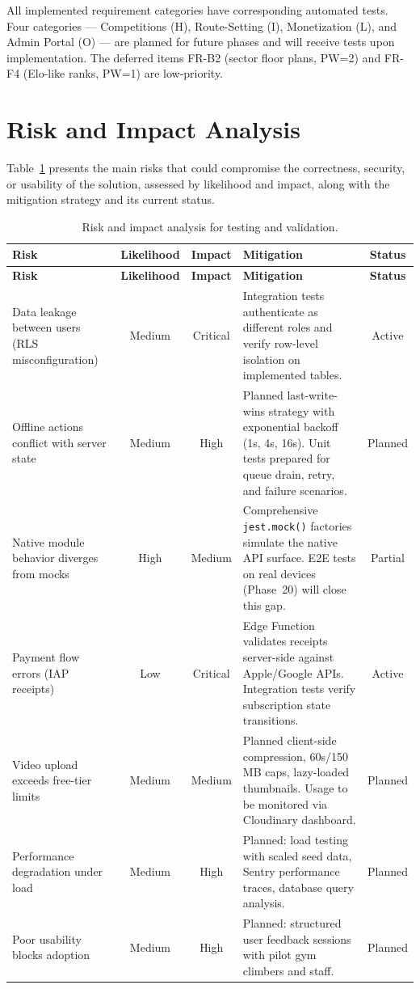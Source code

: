 \documentclass[12pt,a4paper]{report}
\renewcommand\_{\textunderscore\hspace{0pt}}
\begin{document}
All implemented requirement categories have corresponding automated tests. Four categories --- Competitions (H), Route-Setting (I), Monetization (L), and Admin Portal (O) --- are planned for future phases and will receive tests upon implementation. The deferred items FR-B2 (sector floor plans, PW=2) and FR-F4 (Elo-like ranks, PW=1) are low-priority.

\section{Risk and Impact Analysis}

Table~\ref{tab:risk-matrix} presents the main risks that could compromise the correctness, security, or usability of the solution, assessed by likelihood and impact, along with the mitigation strategy and its current status.

\begin{longtable}{p{3.2cm} c c p{5.5cm} c}
\caption{Risk and impact analysis for testing and validation.}\label{tab:risk-matrix}\\
\hline
\textbf{Risk} & \textbf{Likelihood} & \textbf{Impact} & \textbf{Mitigation} & \textbf{Status} \\
\hline
\endfirsthead
\hline
\textbf{Risk} & \textbf{Likelihood} & \textbf{Impact} & \textbf{Mitigation} & \textbf{Status} \\
\hline
\endhead

Data leakage between users (RLS misconfiguration) & Medium & Critical & Integration tests authenticate as different roles and verify row-level isolation on implemented tables. & Active \\
\hline
Offline actions conflict with server state & Medium & High & Planned last-write-wins strategy with exponential backoff (1s, 4s, 16s). Unit tests prepared for queue drain, retry, and failure scenarios. & Planned \\
\hline
Native module behavior diverges from mocks & High & Medium & Comprehensive \texttt{jest.mock()} factories simulate the native API surface. E2E tests on real devices (Phase~20) will close this gap. & Partial \\
\hline
Payment flow errors (IAP receipts) & Low & Critical & Edge Function validates receipts server-side against Apple/Google APIs. Integration tests verify subscription state transitions. & Active \\
\hline
Video upload exceeds free-tier limits & Medium & Medium & Planned client-side compression, 60s/150\,MB caps, lazy-loaded thumbnails. Usage to be monitored via Cloudinary dashboard. & Planned \\
\hline
Performance degradation under load & Medium & High & Planned: load testing with scaled seed data, Sentry performance traces, database query analysis. & Planned \\
\hline
Poor usability blocks adoption & Medium & High & Planned: structured user feedback sessions with pilot gym climbers and staff. & Planned \\
\hline
\end{longtable}
\end{document}
